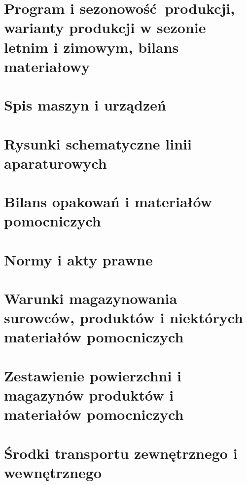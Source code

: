 \documentclass{article}
\begin{document}
\tableofcontents

\newpage





\nocite{Grote1988, Oh1987, Leite2020, Ziaja, 4Szpaki, Kosmopedia, KosmetykWszechCzasów, SubiektynikKosmetyczny, Loczek}







\section{Program i sezonowość produkcji, warianty produkcji w sezonie letnim i zimowym, bilans materiałowy}

\section{Spis maszyn i urządzeń}

\section{Rysunki schematyczne linii aparaturowych}

\section{Bilans opakowań i materiałów pomocniczych}

\section{Normy i akty prawne}

\section{Warunki magazynowania surowców, produktów i niektórych materiałów pomocniczych}

\section{Zestawienie powierzchni i magazynów produktów i materiałów pomocniczych}

\section{Środki transportu zewnętrznego i wewnętrznego}
\end{document}
